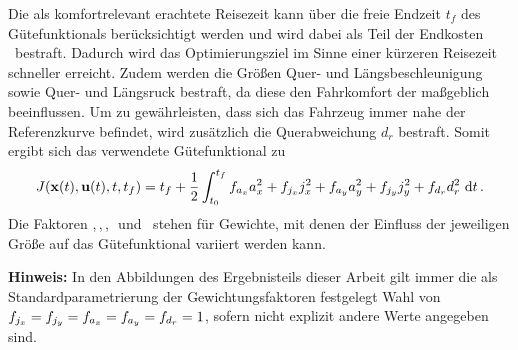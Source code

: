 Die als komfortrelevant erachtete Reisezeit kann über die freie Endzeit $t_f$ des Gütefunktionals berücksichtigt werden und wird dabei als Teil der Endkosten \Vofxoftf~bestraft. Dadurch wird das Optimierungsziel im Sinne einer kürzeren Reisezeit schneller erreicht. Zudem werden die Größen Quer- und Längsbeschleunigung sowie Quer- und Längsruck bestraft, da diese den Fahrkomfort der  maßgeblich beeinflussen. Um zu gewährleisten, dass sich das Fahrzeug immer nahe der Referenzkurve befindet, wird zusätzlich die Querabweichung $d_r$ bestraft. Somit ergibt sich das verwendete Gütefunktional zu
\begin{equation}
	J(\boldsymbol{\mathrm{x}}(t),\boldsymbol{\mathrm{u}}(t),t,t_f) = t_f + \frac{1}{2}\int_{t_0}^{t_f} f_{a_x} a_x^2 + f_{j_x} j_x^2 + f_{a_y} a_y^2 + f_{j_y} j_y^2 + f_{d_r} d_r^2~\textrm{d}{t}\,. \label{eq:J_eingesetzt}
\end{equation}
Die Faktoren \fax,\,\fjx,\,\fay,\,\fjy~und \fdr~stehen für Gewichte, mit denen der Einfluss der jeweiligen Größe auf das Gütefunktional variiert werden kann. 

\textbf{Hinweis:} In den Abbildungen des Ergebnisteils dieser Arbeit gilt immer die als Standardparametrierung der Gewichtungsfaktoren festgelegt Wahl von $f_{j_x} = f_{j_y} = f_{a_x} = f_{a_y} = f_{d_r} = 1$, sofern nicht explizit andere Werte angegeben sind.
 
